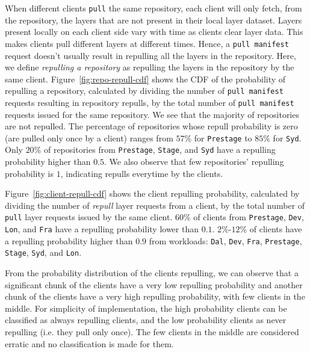 When different clients \texttt{pull} the same repository, 
each client will only fetch, from the repository, the layers that are not present in their local layer dataset. Layers present locally on each client side vary with time as clients clear layer data. This makes clients pull different layers at different times.
Hence, a \texttt{pull manifest} request doesn't usually result in repulling all the layers in the repository. 
Here, we define \emph{repulling a repository} as repulling the layers in the repository by the same client.
Figure~\ref{fig:repo-repull-cdf} shows the CDF of the probability of repulling a repository, calculated by dividing the number of \texttt{pull manifest} requests resulting in repository repulls, by 
the total number of \texttt{pull manifest} requests issued for the same repository.
We see that the majority of repositories are not repulled.
The percentage of repositories whose repull probability is zero (\ie are pulled only once by a client) ranges from $57$\% for \texttt{Prestage} to $85$\% for \texttt{Syd}.
Only $20$\% of repositories from  \texttt{Prestage}, \texttt{Stage}, and 
\texttt{Syd} have a repulling probability higher than $0.5$.
We also observe that few repositories' repulling probability is $1$, indicating repulls everytime by the clients.

Figure~\ref{fig:client-repull-cdf} shows the client repulling probability, calculated by dividing the number of \emph{repull} layer requests from a client, by
the total number of \texttt{pull} layer requests issued by the same client.
$60$\% of clients from \texttt{Prestage}, \texttt{Dev}, \texttt{Lon}, and \texttt{Fra} have a repulling probability lower than $0.1$.
$2$\%-$12$\% of clients have a repulling probability higher than $0.9$ from workloads:
\texttt{Dal}, \texttt{Dev}, \texttt{Fra}, \texttt{Prestage},
\texttt{Stage}, \texttt{Syd}, and \texttt{Lon}.

From the probability distribution of the clients repulling, we can observe that a significant chunk of the clients %
 have a very low repulling probability and another chunk of the clients have a very high repulling probability, with few clients in the middle. For simplicity of implementation, the high probability clients can be classified as always repulling clients, and the low probability clients as never repulling (i.e. they pull only once). The few clients in the middle are considered erratic  and no classification is made for them.



